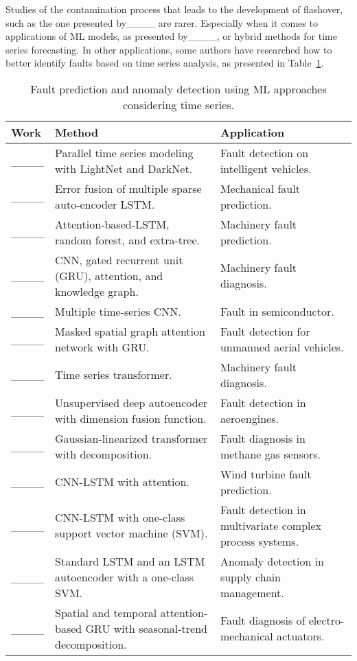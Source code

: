 Studies of the contamination process that leads to the development of flashover, such as the one presented by____ are rarer. Especially when it comes to applications of ML models, as presented by____, or hybrid methods for time series forecasting. In other applications, some authors have researched how to better identify faults based on time series analysis, as presented in Table~\ref{re_w}.

\begin{table}[]
\small
\caption{Fault prediction and anomaly detection using ML approaches considering time series.}
\label{re_w}
\centering
\begin{tabular}{p{3.6cm}p{6cm}p{5cm}}\hline
Work  & Method & Application\\ \hline
____ & Parallel time series modeling with LightNet and DarkNet. & Fault detection on intelligent vehicles.\\
____ & Error fusion of multiple sparse auto-encoder LSTM. & Mechanical fault prediction.\\
____ & Attention-based-LSTM, random forest, and extra-tree. & Machinery fault prediction.
\\
____ & CNN, gated recurrent unit (GRU), attention, and knowledge graph. & Machinery fault diagnosis.\\
____ & Multiple time-series CNN. & Fault %
in semiconductor. \\%
____ & Masked spatial graph attention network with GRU. & Fault detection for unmanned aerial vehicles.\\
____ & Time series transformer. & Machinery fault diagnosis. \\
____ & Unsupervised deep autoencoder with dimension fusion function. & Fault detection in aeroengines. \\
____ & Gaussian-linearized transformer with %
decomposition. & Fault diagnosis in methane gas sensors.\\
____ & CNN-LSTM with attention. & Wind turbine fault prediction.\\
____ & CNN-LSTM with one-class support vector machine (SVM). & Fault detection in multivariate complex process systems.\\
____ & 
Standard LSTM and an LSTM autoencoder with a one-class SVM. & Anomaly detection in supply chain management.\\
____ & Spatial and temporal attention-based GRU with seasonal-trend decomposition. & Fault diagnosis  of electro-mechanical actuators.\\

\end{tabular}
\end{table}
